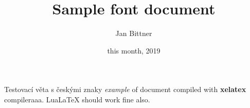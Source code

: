 \documentclass[12pt]{article}
\title{Sample font document}
\author{Jan Bittner}
\date{this month, 2019}
\begin{document}
 
 \maketitle
 
Testovací věta s českými znaky \textit{example} of document compiled 
with \textbf{xelatex} compileraaa. LuaLaTeX should 
work fine also.
 
\end{document}
